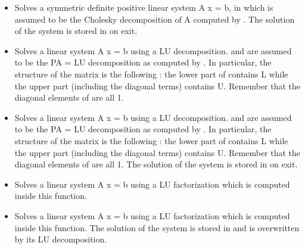 \begin{itemize}
\item {} 
  \sshortdescribe Solves a symmetric definite positive linear system A x = b, 
  in which  is assumed to be the Cholesky decomposition of A
  computed by . The solution of the system is stored in
   on exit.

\item {} 
  \sshortdescribe Solves a linear system A x = b using a LU decomposition.
   and  are assumed to be the PA = LU decomposition as computed
  by . In particular, the structure of the matrix 
  is the following : the lower part of  contains L while the upper part
  (including the diagonal terms) contains U. Remember that the diagonal
  elements of  are all 1.

\item {} 
  \sshortdescribe Solves a linear system A x = b using a LU decomposition.
   and  are assumed to be the PA = LU decomposition as computed
  by . In particular, the structure of the matrix 
  is the following : the lower part of  contains L while the upper part
  (including the diagonal terms) contains U. Remember that the diagonal
  elements of  are all 1. The solution of the system is stored in 
  on exit.
  
\item {} 
  \sshortdescribe Solves a linear system A x = b using a LU factorization
  which is computed inside this function.

\item {} 
  \sshortdescribe Solves a linear system A x = b using a LU factorization
  which is computed inside this function. The solution of the system is stored
  in  and  is overwritten by its LU decomposition.


\end{itemize}
